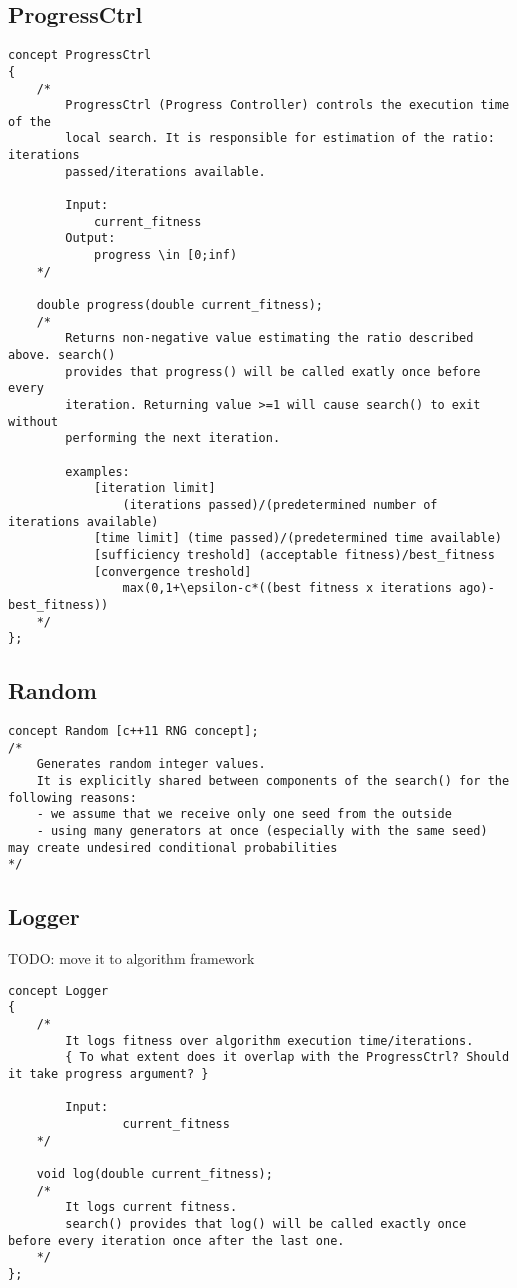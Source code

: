 \subsection{ProgressCtrl}

\begin{lstlisting}
concept ProgressCtrl
{
	/*
		ProgressCtrl (Progress Controller) controls the execution time of the
		local search. It is responsible for estimation of the ratio: iterations
		passed/iterations available.

		Input:
			current_fitness
		Output:
			progress \in [0;inf)
	*/

	double progress(double current_fitness);
	/*
		Returns non-negative value estimating the ratio described above. search()
		provides that progress() will be called exatly once before every
		iteration. Returning value >=1 will cause search() to exit without
		performing the next iteration.

		examples:
			[iteration limit]
				(iterations passed)/(predetermined number of iterations available)
			[time limit] (time passed)/(predetermined time available)
			[sufficiency treshold] (acceptable fitness)/best_fitness
			[convergence treshold]
				max(0,1+\epsilon-c*((best fitness x iterations ago)-best_fitness))
	*/
};
\end{lstlisting}

\subsection{Random}

\begin{lstlisting}
concept Random [c++11 RNG concept];
/*
	Generates random integer values.
	It is explicitly shared between components of the search() for the following reasons:
	- we assume that we receive only one seed from the outside
	- using many generators at once (especially with the same seed) may create undesired conditional probabilities
*/
\end{lstlisting}

\subsection{Logger}

TODO: move it to algorithm framework

\begin{lstlisting}
concept Logger
{
	/*
		It logs fitness over algorithm execution time/iterations.
		{ To what extent does it overlap with the ProgressCtrl? Should it take progress argument? }

		Input:
				current_fitness
	*/

	void log(double current_fitness);
	/*
		It logs current fitness.
		search() provides that log() will be called exactly once before every iteration once after the last one.
	*/
};
\end{lstlisting}

